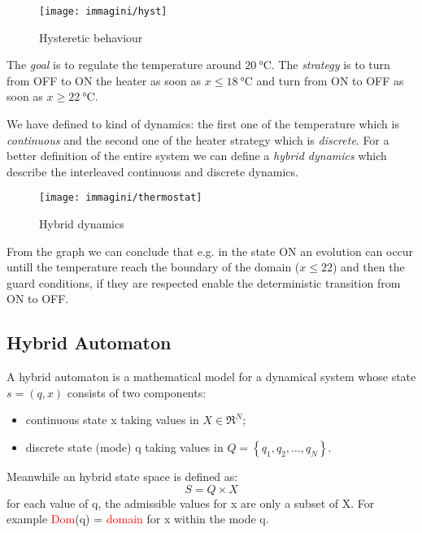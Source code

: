\begin{figure}[h]
	\centering
	\texttt{[image: immagini/hyst]}
	\caption{Hysteretic behaviour}
	\label{fig:hyst}
\end{figure}

The \emph{goal} is to regulate the temperature around $\SI{20}{\celsius}$. The \emph{strategy} is to turn from OFF to ON the heater as soon as $x\le \SI{18}{\celsius}$ and turn from ON to OFF as soon as $x\ge\SI{22}{\celsius}$.

We have defined to kind of dynamics: the first one of the temperature which is \emph{continuous} and the second one of the heater strategy which is \emph{discrete}. For a better definition of the entire system we can define a \emph{hybrid dynamics} which describe the interleaved continuous and discrete dynamics.

\begin{figure}[h]
	\centering
	\texttt{[image: immagini/thermostat]}
	\caption{Hybrid dynamics}
	\label{fig:thermostat}
\end{figure}

From the graph we can conclude that e.g. in the state ON an evolution can occur untill the temperature reach the boundary of the domain ($x\le22$) and then the guard conditions, if they are respected enable the deterministic transition from ON to OFF.

\subsection{Hybrid Automaton}
A hybrid automaton is a mathematical model for a dynamical system whose state $s =(q,x)$ consists of two components:
\begin{itemize}
	\item continuous state x taking values in $X\in\Re^N$;
	\item discrete state (mode) q taking values in $Q = \left\{q_1,q_2, \dots,q_N\right\}$.
\end{itemize}
Meanwhile an hybrid state space is defined as:
\[
S=Q\times X 
\]
for each value of q, the admissible values for x are only a subset of X.
For example \textcolor{red}{Dom}(q) = \textcolor{red}{domain} for x within the mode q.

